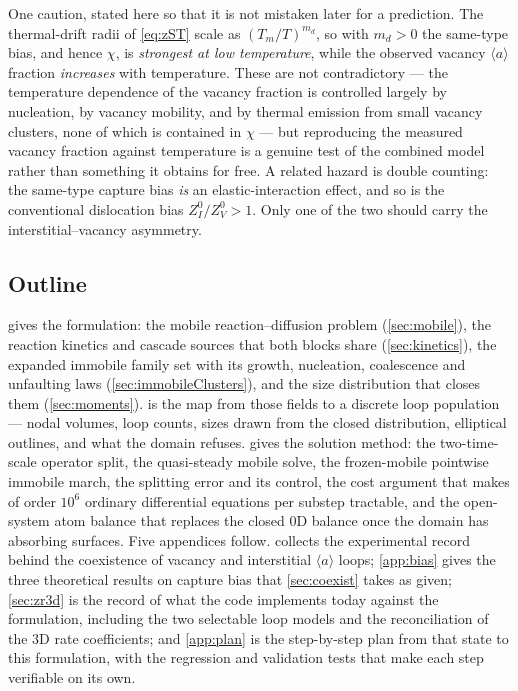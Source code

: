 \documentclass{article}
\newcommand{\aloop}{\ensuremath{\langle a\rangle}}
\begin{document}
One caution, stated here so that it is not mistaken later for a prediction. The
thermal-drift radii of \cref{eq:zST} scale as $(T_m/T)^{m_d}$, so with $m_d>0$
the same-type bias, and hence $\chi$, is \emph{strongest at low temperature},
while the observed vacancy \aloop{} fraction \emph{increases} with temperature.
These are not contradictory --- the temperature dependence of the vacancy
fraction is controlled largely by nucleation, by vacancy mobility, and by
thermal emission from small vacancy clusters, none of which is contained in
$\chi$ --- but reproducing the measured vacancy fraction against temperature is
a genuine test of the combined model rather than something it obtains for free.
A related hazard is double counting: the same-type capture bias \emph{is} an
elastic-interaction effect, and so is the conventional dislocation bias
$Z^0_I/Z^0_V>1$. Only one of the two should carry the interstitial--vacancy
asymmetry.

\subsection{Outline}
\label{sec:outline}

 gives the formulation: the mobile reaction--diffusion problem
(\cref{sec:mobile}), the reaction kinetics and cascade sources that both blocks
share (\cref{sec:kinetics}), the expanded immobile family set with its growth,
nucleation, coalescence and unfaulting laws (\cref{sec:immobileClusters}),
and the size distribution that closes them (\cref{sec:moments}).
 is the map from those fields to a discrete loop
population --- nodal volumes, loop counts, sizes drawn from the closed
distribution, elliptical outlines, and what the domain refuses.
 gives the solution method: the
two-time-scale operator split, the quasi-steady mobile solve, the frozen-mobile
pointwise immobile march, the splitting error and its control, the cost argument
that makes of order $10^6$ ordinary differential equations per substep
tractable, and the open-system atom balance that replaces the closed $0$D
balance once the domain has absorbing surfaces. Five appendices follow.
 collects the experimental record behind the coexistence of
vacancy and interstitial \aloop{} loops; \cref{app:bias} gives the three
theoretical results on capture bias that \cref{sec:coexist} takes as given;
\cref{sec:zr3d} is the record of what the code implements today against the
formulation, including the two selectable loop models and the reconciliation of
the $3$D rate coefficients; and \cref{app:plan} is the step-by-step plan from
that state to this formulation, with the regression and validation tests that
make each step verifiable on its own.
\end{document}
